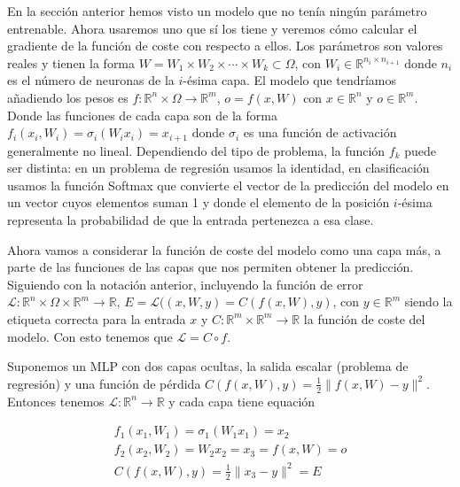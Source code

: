 En la sección anterior hemos visto un modelo que no tenía ningún parámetro entrenable. Ahora usaremos uno que sí los tiene y veremos cómo calcular el gradiente de la función de coste con respecto a ellos. Los parámetros son valores reales y tienen la forma $W= W_1 \times W_2 \times \cdots \times W_k \subset \Omega$, con $W_i \in \mathbb{R}^{n_i \times n_{i+1}}$ donde $n_i$ es el número de neuronas de la $i$-ésima capa. El modelo que tendríamos añadiendo los pesos es $f: \mathbb{R}^n \times \Omega \rightarrow \mathbb{R}^m$, $o=f(x,W)$ con $x \in \mathbb{R}^n$  y $o \in \mathbb{R}^m$. Donde las funciones de cada capa son de la forma $f_i(x_i, W_i)= \sigma_i(W_ix_i)=x_{i+1}$ donde $\sigma_i$ es una función de activación generalmente no lineal. Dependiendo del tipo de problema, la función $f_k$ puede ser distinta: en un problema de regresión usamos la identidad, en clasificación usamos la función Softmax que convierte el vector de la predicción del modelo en un vector cuyos elementos suman 1 y donde el elemento de la posición $i$-ésima representa la probabilidad de que la entrada pertenezca a esa clase.


Ahora vamos a considerar la función de coste del modelo como una capa más, a parte de las funciones de las capas que nos permiten obtener la predicción. Siguiendo con la notación anterior, incluyendo la función de error $\mathcal{L}: \mathbb{R}^n \times \Omega \times \mathbb{R}^m \rightarrow \mathbb{R}$, $E=\mathcal{L}((x,W,y)= C(f(x,W),y)$, con $y \in \mathbb{R}^m$ siendo la etiqueta correcta para la entrada $x$ y $C: \mathbb{R}^m \times \mathbb{R}^m \rightarrow \mathbb{R}$ la función de coste del modelo. Con esto tenemos que $\mathcal{L} = C \circ f$. 


\begin{ejemplo}
    Suponemos un MLP con dos capas ocultas, la salida escalar (problema de regresión) y una función de pérdida $C(f(x,W),y)=\frac{1}{2} \| f(x,W) - y\|^2$. Entonces tenemos $\mathcal{L}:\mathbb{R}^n \rightarrow \mathbb{R}$ y cada capa tiene equación

    
    
    \begin{gather*}
    f_1(x_1, W_1)=\sigma_1(W_1x_1)=x_2 \\
      f_2(x_2, W_2)=W_2x_2=x_3=f(x,W)=o  \\
      C(f(x,W),y)= \frac{1}{2} \| x_3 - y \|^2 = E
    \end{gather*}

    


\end{ejemplo}

